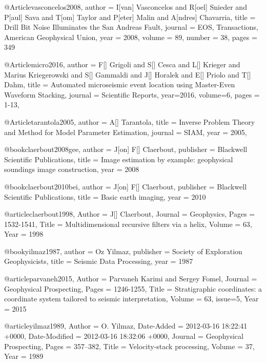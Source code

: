 @Article{vasconcelos2008,
   author = { I[van] Vasconcelos and R[oel] Snieder and P[aul] Sava and T[om] Taylor and P[eter] Malin and A[ndres] Chavarria},
   title = {Drill Bit Noise Illuminates the {S}an {A}ndreas Fault},
   journal = {{EOS}, {T}ransactions, {A}merican {G}eophysical {U}nion},
   year = {2008},
   volume = {89},
   number = {38},
   pages = {349}
}

@Article{micro2016,
  author =	 {F[] Grigoli and S[] Cesca and L[] Krieger and Marius Kriegerowski and S[] Gammaldi and J[] Horalek and E[] Priolo and T[] Dahm},
  title =	 {Automated microseismic event location using Master-Even Waveform Stacking},
  journal =	 {Scientific Reports},
  year=2016,
  volume=6,
  pages =	 {1-13},
}





@Article{tarantola2005,
  author = 	 {A[] Tarantola},
  title = 	 {Inverse Problem Theory and Method for Model Parameter Estimation},
  journal = 	 {SIAM},
  year = 	 2005,
}







@book{claerbout2008gee,
   author = {J[on] F[] Claerbout},
   publisher = {Blackwell Scientific Publications},
   title = {Image estimation by example: geophysical soundings image construction},
   year = {2008}
}

@book{claerbout2010bei,
   author = {J[on] F[] Claerbout},
   publisher = {Blackwell Scientific Publications},
   title = {Basic earth imaging},
   year = {2010}
}

@article{claerbout1998,
	Author = {J[] Claerbout},
	Journal = {Geophysics},
	Pages = {1532-1541},
	Title = {Multidimensional recursive filters via a helix},
	Volume = {63},
	Year = {1998}}

@book{yilmaz1987,
   author = {Oz Yilmaz},
   publisher = {Society of Exploration Geophysicists},
   title = {Seismic Data Processing},
   year = {1987}
}

@article{parvaneh2015,
	Author = {Parvaneh Karimi and Sergey Fomel},
	Journal = {Geophysical Prospecting},
	Pages = {1246-1255},
	Title = {Stratigraphic coordinates: a coordinate system tailored to seismic interpretation},
	Volume = {63},
	issue=5,
	Year = {2015}}
	

@article{yilmaz1989,
	Author = {O. Yilmaz},
	Date-Added = {2012-03-16 18:22:41 +0000},
	Date-Modified = {2012-03-16 18:32:06 +0000},
	Journal = {Geophysical Prospecting},
	Pages = {357--382},
	Title = {Velocity-stack processing},
	Volume = {37},
	Year = {1989}}

